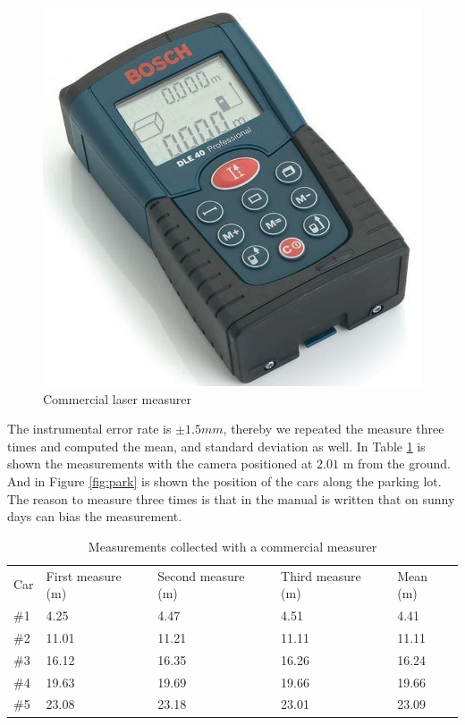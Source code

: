 \begin{figure}[H]
\centering
\includegraphics[scale=0.3]{imagens/trena.jpg}
\caption{Commercial laser measurer}
\label{fig:laser_meas}
\end{figure}

The instrumental error rate is $\pm 1.5 mm$, thereby we repeated the measure three times and computed the mean, and standard deviation as well. In Table \ref{tab:tab_measure} is shown the measurements with the camera positioned at $2.01$ m from the ground. And in Figure \ref{fig:park} is shown the position of the cars along the parking lot. The reason to measure three times is that in the manual is written that on sunny days can bias the measurement. 



\begin{table}[H]
\centering
\caption{Measurements collected with a commercial measurer}
\begin{tabular}{l|l|l|l|l} 
\toprule
Car & First measure (m) & Second measure (m) & Third measure (m) & Mean (m) \\
\#1   & 4.25          & 4.47           & 4.51           & 4.41 \\
\#2   & 11.01         & 11.21          & 11.11          & 11.11\\
\#3   & 16.12         & 16.35          & 16.26          & 16.24\\
\#4   & 19.63         & 19.69          & 19.66          & 19.66\\
\#5   & 23.08         & 23.18          & 23.01          & 23.09\\
\bottomrule
\end{tabular}
\label{tab:tab_measure}
\end{table} 


